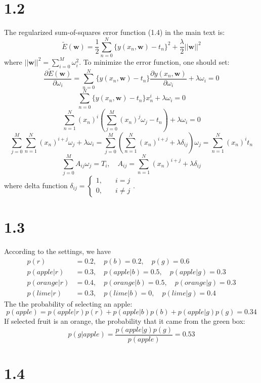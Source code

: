 \documentclass[10pt,a4paper,draft]{book}
\begin{document}
\section*{1.2}
The regularized sum-of-squares error function (1.4) in the main text is:
\begin{equation}
\tilde{E}(\bm{w}) = \frac{1}{2}\sum_{n=0}^N\{y(x_n,\bm{w}) - t_n\}^2 + \frac{\lambda}{2} ||\bm{w}||^2
\end{equation}
where $||\bm{w}||^2 = \sum_{i=0}^M \omega_i^2$. To minimize the error function, one should set:
\begin{equation}
\frac{\partial \tilde{E}(\bm{w})}{\partial \omega_i} =\sum_{n=0}^N \{y(x_n,\bm{w})-t_n\} \frac{\partial y(x_n,\bm{w})}{\partial \omega_i} +\lambda \omega_i=  0
\end{equation}
\begin{equation}
\sum_{n=0}^N \{y(x_n,\bm{w})-t_n\} x_n^i +\lambda \omega_i =0 
\end{equation}
\begin{equation}
\sum_{n=1}^{N} (x_n)^i\left(\sum_{j=0}^M (x_n)^{j}\omega_j - t_n\right) + \lambda \omega_i =0
\end{equation}
\begin{equation}
\sum_{j=0}^M \sum_{n=1}^{N} (x_n)^{i+j}\omega_j + \lambda \omega_i = \sum_{j=0}^M \left(\sum_{n=1}^{N} (x_n)^{i+j} + \lambda \delta_{ij}\right)\omega_j = \sum_{n=1}^{N} (x_n)^i t_n
\end{equation}
\begin{equation}
\sum_{j=0}^M A_{ij}\omega_j= T_i, \quad A_{ij} = \sum_{n=1}^{N} (x_n)^{i+j} + \lambda \delta_{ij} 
\end{equation}
where delta function $ \delta_{ij}=\left\{
\begin{aligned}
1,\quad & i = j \\
0,\quad & i \neq j
\end{aligned}
\right.$.

\section*{1.3}
According to the settings, we have
\begin{equation}
\begin{aligned}
p(r) &= 0.2, \quad p(b) = 0.2, \quad p(g) = 0.6 \\
p(apple|r) &= 0.3, \quad p(apple|b) = 0.5,\quad p(apple|g) = 0.3\\
p(orange|r) &= 0.4, \quad p(orange|b) = 0.5,\quad p(orange|g) = 0.3\\
p(lime|r) &= 0.3, \quad p(lime|b) = 0,\quad p(lime|g) = 0.4
\end{aligned}
\end{equation}
The the probability of selecting an apple:
\begin{equation}
p(apple) = p(apple|r)p(r) + p(apple|b)p(b) + p(apple|g)p(g) = 0.34
\end{equation}
If selected fruit is an orange, the probability that it came from the green box:
\begin{equation}
p(g|apple) = \frac{p(apple|g)p(g)}{p(apple)} = 0.53
\end{equation}

\section*{1.4}
\end{document}

